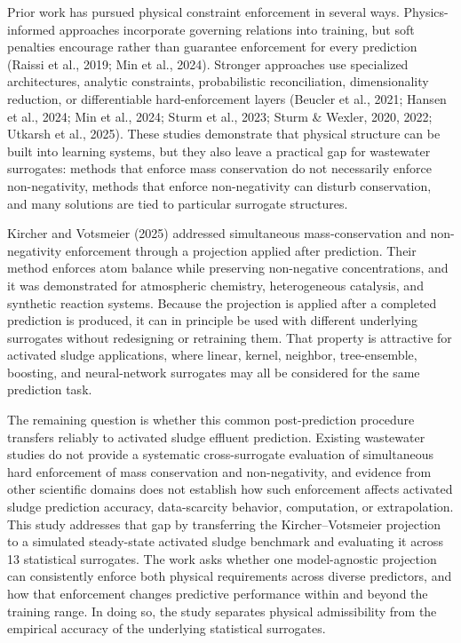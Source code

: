 \documentclass[a4paper,fleqn]{cas-sc}
\begin{document}
Prior work has pursued physical constraint enforcement in several ways. Physics-informed approaches incorporate governing relations into training, but soft penalties encourage rather than guarantee enforcement for every prediction (Raissi et al., 2019; Min et al., 2024). Stronger approaches use specialized architectures, analytic constraints, probabilistic reconciliation, dimensionality reduction, or differentiable hard-enforcement layers (Beucler et al., 2021; Hansen et al., 2024; Min et al., 2024; Sturm et al., 2023; Sturm \& Wexler, 2020, 2022; Utkarsh et al., 2025). These studies demonstrate that physical structure can be built into learning systems, but they also leave a practical gap for wastewater surrogates: methods that enforce mass conservation do not necessarily enforce non-negativity, methods that enforce non-negativity can disturb conservation, and many solutions are tied to particular surrogate structures.

Kircher and Votsmeier (2025) addressed simultaneous mass-conservation and non-negativity enforcement through a projection applied after prediction. Their method enforces atom balance while preserving non-negative concentrations, and it was demonstrated for atmospheric chemistry, heterogeneous catalysis, and synthetic reaction systems. Because the projection is applied after a completed prediction is produced, it can in principle be used with different underlying surrogates without redesigning or retraining them. That property is attractive for activated sludge applications, where linear, kernel, neighbor, tree-ensemble, boosting, and neural-network surrogates may all be considered for the same prediction task.

The remaining question is whether this common post-prediction procedure transfers reliably to activated sludge effluent prediction. Existing wastewater studies do not provide a systematic cross-surrogate evaluation of simultaneous hard enforcement of mass conservation and non-negativity, and evidence from other scientific domains does not establish how such enforcement affects activated sludge prediction accuracy, data-scarcity behavior, computation, or extrapolation. This study addresses that gap by transferring the Kircher--Votsmeier projection to a simulated steady-state activated sludge benchmark and evaluating it across 13 statistical surrogates. The work asks whether one model-agnostic projection can consistently enforce both physical requirements across diverse predictors, and how that enforcement changes predictive performance within and beyond the training range. In doing so, the study separates physical admissibility from the empirical accuracy of the underlying statistical surrogates.
\end{document}
